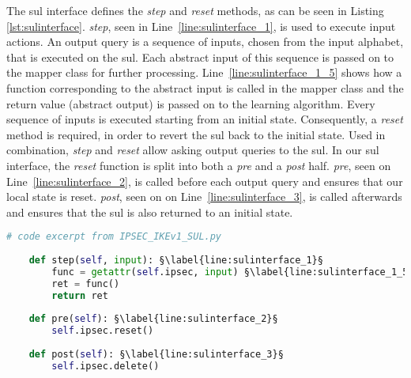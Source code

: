 \newpage
The \ac{sul} interface defines the \emph{step} and \emph{reset} methods, as can be seen in Listing \ref{lst:sulinterface}. \emph{step}, seen in Line~\ref{line:sulinterface_1}, is used to execute input actions. An output query is a sequence of inputs, chosen from the input alphabet, that is executed on the \ac{sul}. Each abstract input of this sequence is passed on to the mapper class for further processing. Line~\ref{line:sulinterface_1_5} shows how a function corresponding to the abstract input is called in the mapper class and the return value (abstract output) is passed on to the learning algorithm. Every sequence of inputs is executed starting from an initial state. Consequently, a \emph{reset} method is required, in order to revert the \ac{sul} back to the initial state. Used in combination, \emph{step} and \emph{reset} allow asking output queries to the \ac{sul}. In our \ac{sul} interface, the \emph{reset} function is split into both a \emph{pre} and a \emph{post} half. \emph{pre}, seen on Line~\ref{line:sulinterface_2}, is called before each output query and ensures that our local state is reset. \emph{post}, seen on on Line~\ref{line:sulinterface_3}, is called afterwards and ensures that the \ac{sul} is also returned to an initial state. \\

\begin{lstlisting}[float=h, caption=SUL interface methods code excerpt., label=lst:sulinterface, language=python, escapechar=§]
	# code excerpt from IPSEC_IKEv1_SUL.py
	
	def step(self, input): §\label{line:sulinterface_1}§
		func = getattr(self.ipsec, input) §\label{line:sulinterface_1_5}§
		ret = func()
		return ret
	
	def pre(self): §\label{line:sulinterface_2}§
		self.ipsec.reset()
	
	def post(self): §\label{line:sulinterface_3}§
		self.ipsec.delete()
\end{lstlisting}

